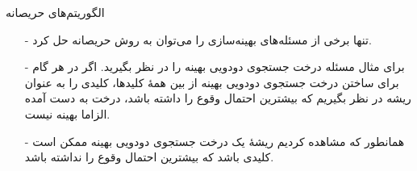 \begin{frame}{‌الگوریتم‌های حریصانه}
\begin{itemize}\itemr
\item[-]
تنها برخی از مسئله‌های بهینه‌سازی را می‌توان به روش حریصانه حل کرد.
\item[-]
برای مثال مسئله درخت جستجوی دودویی بهینه را در نظر بگیرید. اگر در هر گام برای ساختن درخت جستجوی دودویی بهینه از بین همهٔ کلیدها، کلیدی را به عنوان ریشه در نظر بگیریم که بیشترین احتمال وقوع را داشته باشد، درخت به دست آمده الزاما بهینه نیست.
\item[-]
همانطور که مشاهده کردیم ریشهٔ یک درخت جستجوی دودویی بهینه ممکن است کلیدی باشد که بیشترین احتمال وقوع را نداشته باشد.
\end{itemize}
\end{frame}
